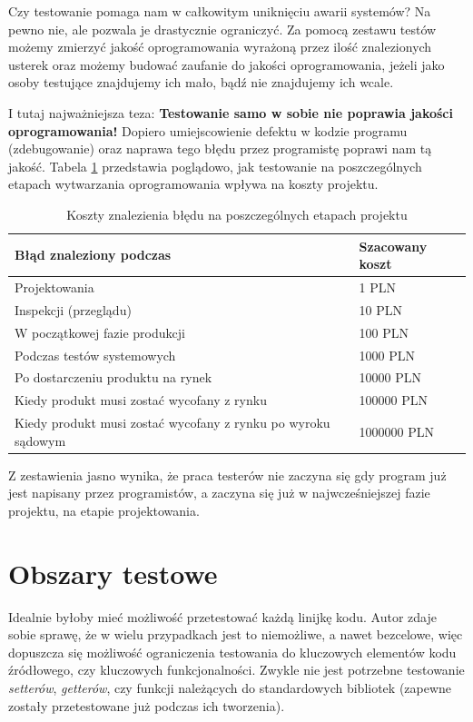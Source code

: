 Czy testowanie pomaga nam w całkowitym uniknięciu awarii systemów? Na pewno nie, ale pozwala je drastycznie ograniczyć. Za pomocą zestawu testów możemy zmierzyć jakość oprogramowania wyrażoną przez ilość znalezionych usterek oraz możemy budować zaufanie do jakości oprogramowania, jeżeli jako osoby testujące znajdujemy ich mało, bądź nie znajdujemy ich wcale.

I tutaj najważniejsza teza: \textbf{Testowanie samo w sobie nie poprawia jakości oprogramowania!} Dopiero umiejscowienie defektu w kodzie programu (zdebugowanie) oraz naprawa tego błędu przez programistę poprawi nam tą jakość. Tabela \ref{tab:koszty_bledu} przedstawia poglądowo, jak testowanie na poszczególnych etapach wytwarzania oprogramowania wpływa na koszty projektu.

\begin{table}[]
\centering
\caption{Koszty znalezienia błędu na poszczególnych etapach projektu}
\label{tab:koszty_bledu}
\begin{tabular}{|l|l|}
\hline
\textbf{Błąd znaleziony podczas} & \textbf{Szacowany koszt} \\ \hline
Projektowania & 1 PLN	\\ \hline
Inspekcji (przeglądu) & 10 PLN	\\ \hline
W początkowej fazie produkcji & 100 PLN	\\ \hline
Podczas testów systemowych & 1000 PLN	\\ \hline
Po dostarczeniu produktu na rynek & 10000 PLN	\\ \hline
Kiedy produkt musi zostać wycofany z rynku & 100000 PLN	\\ \hline
Kiedy produkt musi zostać wycofany z rynku po wyroku sądowym & 1000000 PLN	\\ \hline
\end{tabular}
\end{table}

Z zestawienia jasno wynika, że praca testerów nie zaczyna się gdy program już jest napisany przez programistów, a zaczyna się już w najwcześniejszej fazie projektu, na etapie projektowania.

\section{Obszary testowe}
Idealnie byłoby mieć możliwość przetestować każdą linijkę kodu. Autor zdaje sobie sprawę, że w wielu przypadkach jest to niemożliwe, a nawet bezcelowe, więc dopuszcza się możliwość ograniczenia testowania do kluczowych elementów kodu źródłowego, czy kluczowych funkcjonalności. Zwykle nie jest potrzebne testowanie \textit{setterów}, \textit{getterów}, czy funkcji należących do standardowych bibliotek (zapewne zostały przetestowane już podczas ich tworzenia). 

